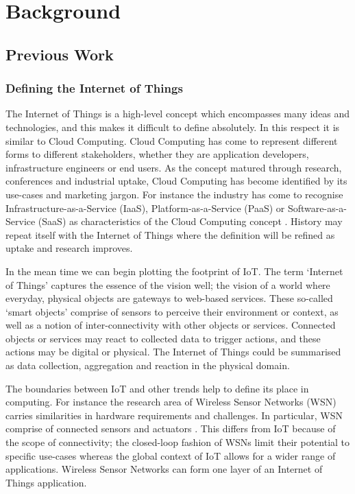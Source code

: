 \chapter{Background}
  \section{Previous Work}
    \subsection{Defining the Internet of Things}
      The Internet of Things is a high-level concept which encompasses many ideas and technologies, and this makes it difficult to define absolutely. In this respect it is similar to Cloud Computing. Cloud Computing has come to represent different forms to different stakeholders, whether they are application developers, infrastructure engineers or end users. As the concept matured through research, conferences and industrial uptake, Cloud Computing has become identified by its use-cases and marketing jargon. For instance the industry has come to recognise Infrastructure-as-a-Service (IaaS), Platform-as-a-Service (PaaS) or Software-as-a-Service (SaaS) as characteristics of the Cloud Computing concept \citep{viewOfCloud}. History may repeat itself with the Internet of Things where the definition will be refined as uptake and research improves.

      In the mean time we can begin plotting the footprint of IoT. The term `Internet of Things' captures the essence of the vision well; the vision of a world where everyday, physical objects are gateways to web-based services. These so-called `smart objects' comprise of sensors to perceive their environment or context, as well as a notion of inter-connectivity with other objects or services. Connected objects or services may react to collected data to trigger actions, and these actions may be digital or physical. The Internet of Things could be summarised as data collection, aggregation and reaction in the physical domain.

      The boundaries between IoT and other trends help to define its place in computing. For instance the research area of Wireless Sensor Networks (WSN) carries similarities in hardware requirements and challenges. In particular, WSN comprise of connected sensors and actuators \citep{Mottola:2011}. This differs from IoT because of the scope of connectivity; the closed-loop fashion of WSNs limit their potential to specific use-cases whereas the global context of IoT allows for a wider range of applications. Wireless Sensor Networks can form one layer of an Internet of Things application.

